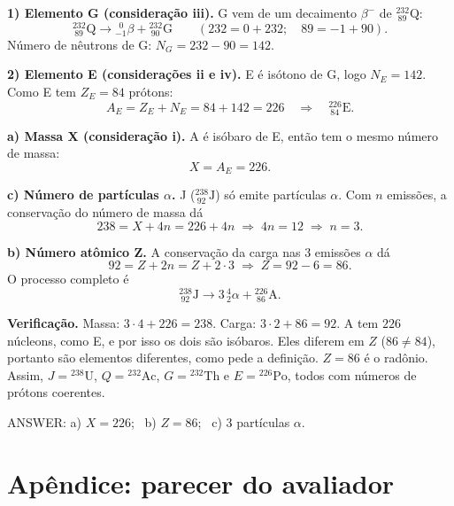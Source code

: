 \documentclass{article}%
\begin{document}
\medskip
\textbf{1) Elemento G (consideração iii).} G vem de um decaimento $\beta^-$ de ${}^{232}_{\ 89}\text{Q}$:
\[
{}^{232}_{\ 89}\text{Q} \rightarrow {}^{\ \ 0}_{-1}\beta + {}^{232}_{\ 90}\text{G}
\qquad (232 = 0 + 232;\quad 89 = -1 + 90).
\]
Número de nêutrons de G: $N_G = 232 - 90 = 142$.

\medskip
\textbf{2) Elemento E (considerações ii e iv).} E é isótono de G, logo $N_E = 142$. Como E tem $Z_E = 84$ prótons:
\[
A_E = Z_E + N_E = 84 + 142 = 226 \quad\Rightarrow\quad {}^{226}_{\ 84}\text{E}.
\]

\medskip
\textbf{a) Massa X (consideração i).} A é isóbaro de E, então tem o mesmo número de massa:
\[
X = A_E = 226 .
\]

\medskip
\textbf{c) Número de partículas $\alpha$.} J (${}^{238}_{\ 92}\text{J}$) só emite partículas $\alpha$. Com $n$ emissões, a conservação do número de massa dá
\[
238 = X + 4n = 226 + 4n \;\Rightarrow\; 4n = 12 \;\Rightarrow\; n = 3 .
\]

\medskip
\textbf{b) Número atômico Z.} A conservação da carga nas 3 emissões $\alpha$ dá
\[
92 = Z + 2n = Z + 2 \cdot 3 \;\Rightarrow\; Z = 92 - 6 = 86 .
\]
O processo completo é
\[
{}^{238}_{\ 92}\text{J} \rightarrow 3\,{}^{4}_{2}\alpha + {}^{226}_{\ 86}\text{A}.
\]

\medskip
\textbf{Verificação.} Massa: $3\cdot 4 + 226 = 238$. Carga: $3\cdot 2 + 86 = 92$. A tem $226$ núcleons, como E, e por isso os dois são isóbaros. Eles diferem em $Z$ ($86 \neq 84$), portanto são elementos diferentes, como pede a definição. $Z = 86$ é o radônio. Assim, $J = {}^{238}\text{U}$, $Q = {}^{232}\text{Ac}$, $G = {}^{232}\text{Th}$ e $E = {}^{226}\text{Po}$, todos com números de prótons coerentes.

\medskip
ANSWER: a) $X = 226$; \ b) $Z = 86$; \ c) 3 partículas $\alpha$.%
\newpage%
\section*{Apêndice: parecer do avaliador}%
\end{document}
